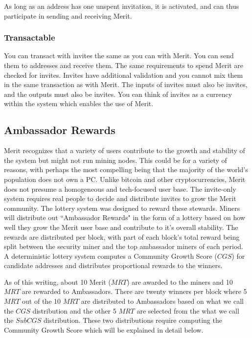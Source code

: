 \documentclass{article}
\begin{document}
As long as an address has one unspent invitation, it is activated, and can thus participate in sending
and receiving Merit.

\subsubsection{Transactable}

You can transact with invites the same as you can with Merit.
You can send them to addresses and receive them.  The same requirements to spend
Merit are checked for invites.  Invites have additional validation and you cannot
mix them in the same transaction as with Merit.  The inputs of invites must also
be invites, and the outputs must also be invites.  You can think of invites as
a currency within the system which enables the use of Merit.

\subsection{Ambassador Rewards}

Merit recognizes that a variety of users contribute to the growth and stability
of the system but might not run mining nodes.  This could be for a variety of reasons, with 
perhaps the most compelling being that the majority of the world's population does
not own a PC.  Unlike bitcoin and other cryptocurrencies, Merit does not presume a
homogeneous and tech-focused user base.  The invite-only system requires real people
to decide and distribute invites to grow the Merit community.  The lottery system 
was designed to reward these stewards.  Miners will distribute out ``Ambassador Rewards"
in the form of a lottery based on how well they grow the Merit user base and
contribute to it's overall stability.  The rewards are distributed per block, with
part of each block's total reward being split between the security miner and the
top ambassador miners of each period.  A deterministic lottery system computes
a Community Growth Score ($CGS$) for candidate addresses and distributes
proportional rewards to the winners.

As of this writing, about 10 Merit ($MRT$) are awarded to the miners and 10 $MRT$
are rewarded to Ambassadors. There are twenty winners per block where 5 $MRT$
out of the 10 $MRT$ are distributed to Ambassadors based on what we call the 
$CGS$ distribution and the other 5 $MRT$ are selected from the what we call the $SubCGS$
distribution. These two distributions require computing the Community Growth Score
which will be explained in detail below.
\end{document}
